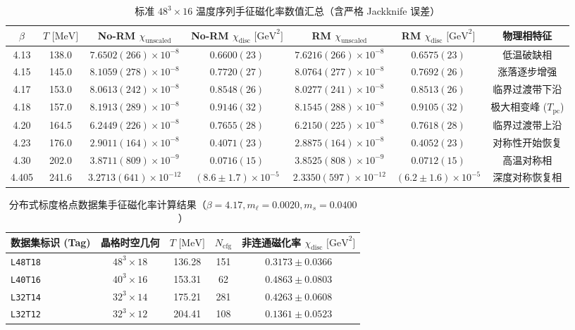 \documentclass[11pt,a4paper]{ctexart}
\begin{document}
\begin{table}[H]
\centering
\footnotesize
\setlength{\tabcolsep}{3.5pt}
\caption{标准 $48^3 \times 16$ 温度序列手征磁化率数值汇总（含严格 Jackknife 误差）}
\label{tab:susceptibility_data}
\begin{tabular}{ccccccc}
\toprule
$\beta$ & $T\text{ [MeV]}$ & No-RM $\chi_{\text{unscaled}}$ & No-RM $\chi_{\text{disc}}\text{ [GeV}^2\text{]}$ & RM $\chi_{\text{unscaled}}$ & RM $\chi_{\text{disc}}\text{ [GeV}^2\text{]}$ & 物理相特征 \\
\midrule
4.13  & 138.0 & $7.6502(266) \times 10^{-8}$ & $0.6600(23)$ & $7.6216(266) \times 10^{-8}$ & $0.6575(23)$ & 低温破缺相 \\
4.15  & 145.0 & $8.1059(278) \times 10^{-8}$ & $0.7720(27)$ & $8.0764(277) \times 10^{-8}$ & $0.7692(26)$ & 涨落逐步增强 \\
4.17  & 153.0 & $8.0613(242) \times 10^{-8}$ & $0.8548(26)$ & $8.0277(241) \times 10^{-8}$ & $0.8513(26)$ & 临界过渡带下沿 \\
4.18  & 157.0 & $8.1913(289) \times 10^{-8}$ & $0.9146(32)$ & $8.1545(288) \times 10^{-8}$ & $0.9105(32)$ & 极大相变峰 ($T_{\text{pc}}$) \\
4.20  & 164.5 & $6.2449(226) \times 10^{-8}$ & $0.7655(28)$ & $6.2150(225) \times 10^{-8}$ & $0.7618(28)$ & 临界过渡带上沿 \\
4.23  & 176.0 & $2.9011(164) \times 10^{-8}$ & $0.4071(23)$ & $2.8875(164) \times 10^{-8}$ & $0.4052(23)$ & 对称性开始恢复 \\
4.30  & 202.0 & $3.8711(809) \times 10^{-9}$ & $0.0716(15)$ & $3.8525(808) \times 10^{-9}$ & $0.0712(15)$ & 高温对称相 \\
4.405 & 241.6 & $3.2713(641) \times 10^{-12}$ & $(8.6 \pm 1.7) \times 10^{-5}$ & $2.3350(597) \times 10^{-12}$ & $(6.2 \pm 1.6) \times 10^{-5}$ & 深度对称恢复相 \\
\bottomrule
\end{tabular}
\end{table}

\begin{table}[H]
\centering
\small
\setlength{\tabcolsep}{8pt}
\caption{分布式标度格点数据集手征磁化率计算结果（$\beta=4.17, m_\ell=0.0020, m_s=0.0400$）}
\label{tab:distributed_susceptibility}
\begin{tabular}{lcccc}
\toprule
数据集标识 (Tag) & 晶格时空几何 & $T\text{ [MeV]}$ & $N_{\text{cfg}}$ & 非连通磁化率 $\chi_{\text{disc}}\text{ [GeV}^2\text{]}$ \\
\midrule
\texttt{L48T18} & $48^3 \times 18$ & 136.28 & 151 & $0.3173 \pm 0.0366$ \\
\texttt{L40T16} & $40^3 \times 16$ & 153.31 & 62  & $0.4863 \pm 0.0803$ \\
\texttt{L32T14} & $32^3 \times 14$ & 175.21 & 281 & $0.4263 \pm 0.0608$ \\
\texttt{L32T12} & $32^3 \times 12$ & 204.41 & 108 & $0.1361 \pm 0.0523$ \\
\bottomrule
\end{tabular}
\end{table}
\end{document}
